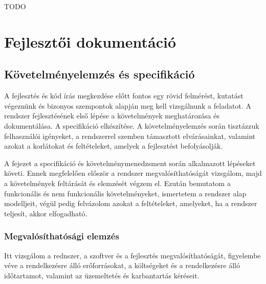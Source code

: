 \documentclass[12pt,a4paper]{report}
\begin{document}
TODO

\part{Fejlesztői dokumentáció}

\chapter{Követelményelemzés és specifikáció}

A fejlesztés és kód írás megkezdése előtt fontos egy rövid felmérést, kutatást
végeznünk és bizonyos szempontok alapján meg kell vizsgálnunk a feladatot.
A rendszer fejlesztésének első lépése a követelmények meghatározása és dokumentálása.
A specifikáció elkészítése.
 A követelményelemzés során tisztázzuk felhasználói igényeket, a rendszerrel szemben támasztott elvárásainkat,
valamint azokat a korlátokat és feltételeket, amelyek a fejlesztést befolyásolják.
 
   
A fejezet a specifikáció és követelménymenedzsment során alkalmazott
lépéseket követi. Ennek megfelelően először a rendszer megvalósíthatóságát
  vizsgálom, majd a követelmények feltárását és elemzését végzem el. 
Ezután bemutatom a funkcionális és nem funkcionális követelményeket, 
ismertetem a rendszer alap modelljeit, végül pedig felvázolom azokat a feltételeket, amelyeket,
ha a rendszer teljesít, akkor elfogadható.

\section{Megvalósíthatósági elemzés}
Itt vizsgálom a rednszer, a szoftver és a fejlesztés megvalósíthatóságát,
 figyelembe véve a rendelkezésre álló erőforrásokat, a költségeket és a rendelkezésre álló időtartamot,
  valamint az üzemeltetés és karbantartás kéréseit.
\end{document}
